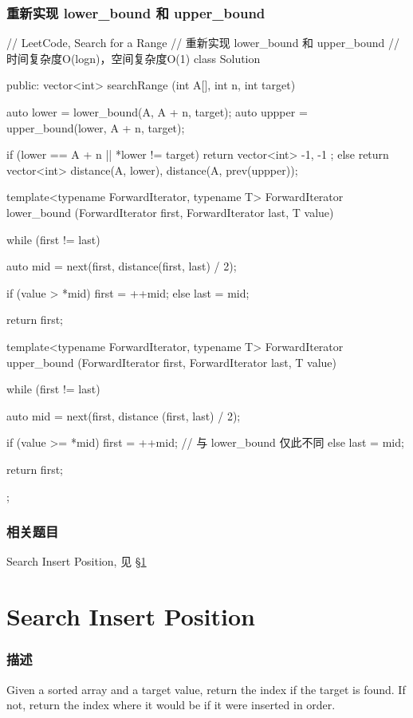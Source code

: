 \subsubsection{重新实现 lower_bound 和 upper_bound}
\begin{Code}
	// LeetCode, Search for a Range
	// 重新实现 lower_bound 和 upper_bound
	// 时间复杂度O(logn)，空间复杂度O(1)
	class Solution {
		public:
		vector<int> searchRange (int A[], int n, int target) {
			auto lower = lower_bound(A, A + n, target);
			auto uppper = upper_bound(lower, A + n, target);
			
			if (lower == A + n || *lower != target)
			return vector<int> { -1, -1 };
			else
			return vector<int> {distance(A, lower), distance(A, prev(uppper))};
		}
		
		template<typename ForwardIterator, typename T>
		ForwardIterator lower_bound (ForwardIterator first,
		ForwardIterator last, T value) {
			while (first != last) {
				auto mid = next(first, distance(first, last) / 2);
				
				if (value > *mid)   first = ++mid;
				else                last = mid;
			}
			
			return first;
		}
		
		template<typename ForwardIterator, typename T>
		ForwardIterator upper_bound (ForwardIterator first,
		ForwardIterator last, T value) {
			while (first != last) {
				auto mid = next(first, distance (first, last) / 2);
				
				if (value >= *mid)   first = ++mid;  // 与 lower_bound 仅此不同
				else                 last = mid;
			}
			
			return first;
		}
	};
\end{Code}

\subsubsection{相关题目}
\begindot
\item Search Insert Position, 见 \S \ref{sec:search-insert-position}
\myenddot


\section{Search Insert Position} %
\label{sec:search-insert-position}


\subsubsection{描述}
Given a sorted array and a target value, return the index if the target is found. If not, return the index where it would be if it were inserted in order.

